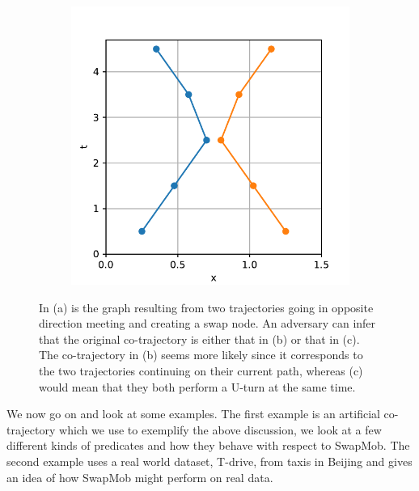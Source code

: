 \documentclass[12pt]{article}
\theoremstyle{definition}
\begin{document}
\begin{figure}
\begin{subfigure}[t]{0.3\textwidth}
      \caption{}
      \label{fig:u-turn-a}
    \end{subfigure}
    \begin{subfigure}[t]{0.3\textwidth}
      \includegraphics[width=\textwidth]{u-turn-b.pdf}
      \caption{}
      \label{fig:u-turn-b}
    \end{subfigure}
    \caption{In (a) is the graph resulting from two trajectories going
      in opposite direction meeting and creating a swap node. An
      adversary can infer that the original co-trajectory is either
      that in (b) or that in (c). The co-trajectory in (b) seems more
      likely since it corresponds to the two trajectories continuing
      on their current path, whereas (c) would mean that they both
      perform a U-turn at the same time.}
    \label{fig:u-turn}
\end{figure}

We now go on and look at some examples. The first example is an
artificial co-trajectory which we use to exemplify the above
discussion, we look at a few different kinds of predicates and how
they behave with respect to SwapMob. The second example uses a real
world dataset, T-drive, from taxis in Beijing
\cite{yuan_t-drive:_2010,yuan_driving_2011} and gives an idea of how
SwapMob might perform on real data.
\end{document}
